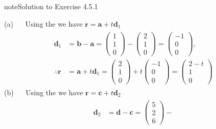 \documentclass[letterpaper,10pt,english]{jupyterBook}
\begin{document}
\begin{sphinxadmonition}{note}{Solution to Exercise 4.5.1}



\sphinxAtStartPar
(a)   Using the {\hyperref[\detokenize{_pages/4.1_Lines:vector-equation-of-a-line-definition}]{}} we have \(\mathbf{r} = \mathbf{a} + t\mathbf{d}_1\)
\begin{equation*}
\begin{split} \begin{align*}
    \mathbf{d}_1 &= \mathbf{b} - \mathbf{a} =
    \begin{pmatrix} 1 \\ 1 \\ 0 \end{pmatrix} -
    \begin{pmatrix} 2 \\ 1 \\ 0 \end{pmatrix} = 
    \begin{pmatrix} -1 \\ 0 \\ 0 \end{pmatrix}, \\
    \therefore \mathbf{r} &= \mathbf{a} + t\mathbf{d}_1 =
    \begin{pmatrix} 2 \\ 1 \\ 0 \end{pmatrix} + t 
    \begin{pmatrix} -1 \\ 0 \\ 0 \end{pmatrix} = 
    \begin{pmatrix} 2 - t \\ 1 \\ 0 \end{pmatrix}
\end{align*} \end{split}
\end{equation*}
\sphinxAtStartPar
(b)   Using the {\hyperref[\detokenize{_pages/4.1_Lines:vector-equation-of-a-line-definition}]{}} we have \(\mathbf{r} = \mathbf{c} + t\mathbf{d}_2\)
\begin{equation*}
\begin{split} \begin{align*}
    \mathbf{d}_2 &= \mathbf{d} - \mathbf{c} =
    \begin{pmatrix} 5 \\ 2 \\ 6 \end{pmatrix} -

\end{align*}
\end{split}
\end{equation*}
\end{sphinxadmonition}
\end{document}
